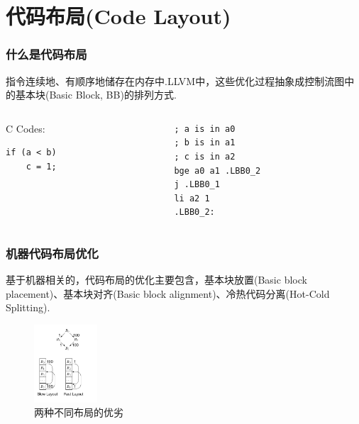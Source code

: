 \section{代码布局(Code Layout)}

\begin{frame}[fragile]
    \frametitle{什么是代码布局}
    指令连续地、有顺序地储存在内存中.LLVM中，这些优化过程抽象成控制流图中的基本块(Basic Block, BB)的排列方式.

    \begin{columns}
        \begin{column}{0.2\textwidth}
            \centering
            C Codes:
            \begin{lstlisting}
if (a < b)
    c = 1;\end{lstlisting}
        \end{column}
        \begin{column}{0.5\textwidth}
            \begin{lstlisting}[language={[RISC-V]Assembler}]
; a is in a0
; b is in a1
; c is in a2
bge a0 a1 .LBB0_2
j .LBB0_1
li a2 1
.LBB0_2:\end{lstlisting}
        \end{column}
    \end{columns}
\end{frame}

\begin{frame}
    \frametitle{机器代码布局优化}
    基于机器相关的，代码布局的优化主要包含，基本块放置(Basic block placement)、基本块对齐(Basic block alignment)、冷热代码分离(Hot-Cold Splitting)\cite{bakhvalov-2019}.
    \begin{figure}
        \centering
        \includegraphics[width=0.21\textwidth]{images/layout_compare.png}
        \caption{两种不同布局的优劣\cite{cooper2011engineering}}
    \end{figure}

\end{frame}


